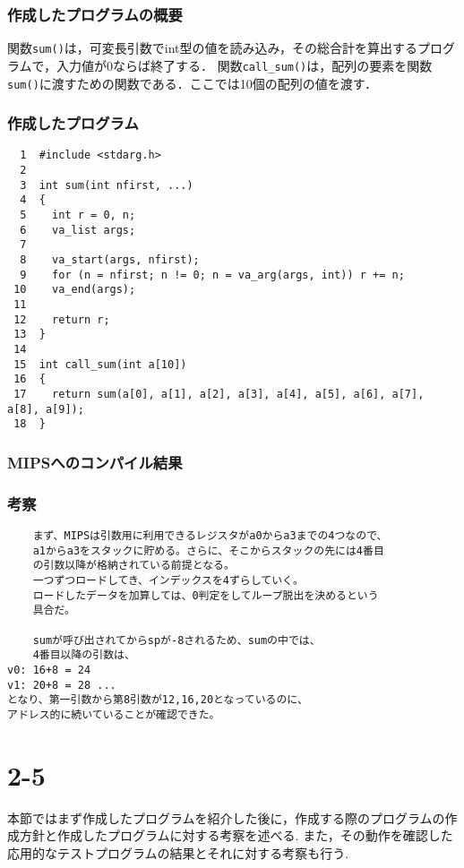 \documentclass[a4j,11pt]{jarticle}
\begin{document}
  \subsubsection{作成したプログラムの概要}
  関数\verb|sum()|は，可変長引数でint型の値を読み込み，その総合計を算出するプログラムで，入力値が0ならば終了する．
  関数\verb|call_sum()|は，配列の要素を関数\verb|sum()|に渡すための関数である．ここでは10個の配列の値を渡す．
  \subsubsection{作成したプログラム}
  \begin{verbatim}
  1  #include <stdarg.h>
  2
  3  int sum(int nfirst, ...)
  4  {
  5    int r = 0, n;
  6    va_list args;
  7
  8    va_start(args, nfirst);
  9    for (n = nfirst; n != 0; n = va_arg(args, int)) r += n;
 10    va_end(args);
 11
 12    return r;
 13  }
 14
 15  int call_sum(int a[10])
 16  {
 17    return sum(a[0], a[1], a[2], a[3], a[4], a[5], a[6], a[7], a[8], a[9]);
 18  }
  \end{verbatim}
  \subsubsection{MIPSへのコンパイル結果}
  \subsubsection{考察}
  \begin{verbatim}
    まず、MIPSは引数用に利用できるレジスタがa0からa3までの4つなので、
    a1からa3をスタックに貯める。さらに、そこからスタックの先には4番目
    の引数以降が格納されている前提となる。 
    一つずつロードしてき、インデックスを4ずらしていく。
    ロードしたデータを加算しては、0判定をしてループ脱出を決めるという
    具合だ。

    sumが呼び出されてからspが-8されるため、sumの中では、
    4番目以降の引数は、
v0: 16+8 = 24
v1: 20+8 = 28 ...
となり、第一引数から第8引数が12,16,20となっているのに、
アドレス的に続いていることが確認できた。
  \end{verbatim}

 \section{2-5}
本節ではまず作成したプログラムを紹介した後に，作成する際のプログラムの作成方針と作成したプログラムに対する考察を述べる.
また，その動作を確認した応用的なテストプログラムの結果とそれに対する考察も行う.
\end{document}
